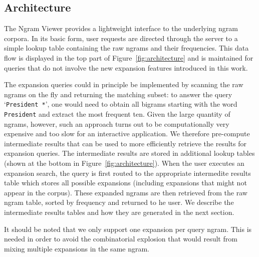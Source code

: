 \documentclass[11pt,a4paper]{article}
\newcommand{\query}[1]{\texttt{#1}}
\begin{document}
\subsection{Architecture}
The Ngram Viewer provides a lightweight interface to the underlying ngram corpora. In its basic form, user requests are directed through the server to a simple lookup table containing the raw ngrams and their frequencies. This data flow is displayed in the top part of Figure~\ref{fig:architecture} and is maintained for queries that do not involve the new expansion features introduced in this work.

The expansion queries could in principle be implemented by scanning the raw ngrams on the fly and returning the matching subset: to answer the query `\query{President *}', one would need to obtain all bigrams starting with the word \query{President} and extract the most frequent ten. Given the large quantity of ngrams, however, such an approach turns out to be computationally very expensive and too slow for an interactive application. We therefore pre-compute intermediate results that can be used to more efficiently retrieve the results for expansion queries. The intermediate results are stored in additional lookup tables (shown at the bottom in Figure~\ref{fig:architecture}). When the user executes an expansion search, the query is first routed to the appropriate intermedite results table which stores all possible expansions (including expansions that might not appear in the corpus).  These expanded ngrams are then retrieved from the raw ngram table, sorted by frequency and returned to he user.
We describe the intermediate results tables and how they are generated in the next section.

It should be noted that we only support one expansion per query ngram. This is needed in order to avoid the combinatorial explosion that would result from mixing multiple expansions in the same ngram.
\end{document}
